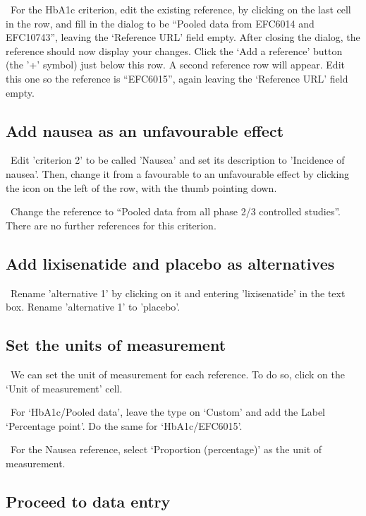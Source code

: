 \documentclass[00_mcda_tutorial.tex]{subfiles}
\begin{document}
\noindent \leftpointright \, For the HbA1c criterion, edit the existing reference, by clicking on the last cell in the row, and fill in the dialog to be  “Pooled data from EFC6014 and EFC10743”, leaving the ‘Reference URL’ field empty. After closing the dialog, the reference should now display your changes. Click  the ‘Add a reference’ button (the '+' symbol) just below this row. A second reference row will appear. Edit this one so the reference is “EFC6015”, again leaving the ‘Reference URL’ field empty.

\subsection*{Add nausea as an unfavourable effect}
\noindent \leftpointright \, Edit 'criterion 2' to be called 'Nausea' and set its description to 'Incidence of nausea'. Then, change it from a favourable to an unfavourable effect by clicking the icon on the left of the row, with the thumb pointing down.
\newline

\noindent \leftpointright \, Change the reference to “Pooled data from all phase 2/3 controlled studies”.  There are no further references for this criterion.

\subsection*{Add lixisenatide and placebo as alternatives}
\noindent \leftpointright \, Rename 'alternative 1' by clicking on it and entering 'lixisenatide' in the text box. Rename 'alternative 1' to 'placebo'.

\subsection*{Set the units of measurement}
\noindent \leftpointright \, We can set the unit of measurement for each reference. To do so, click on the ‘Unit of measurement’ cell.
\newline

\noindent \leftpointright \, For ‘HbA1c/Pooled data’, leave the type on ‘Custom’ and add the Label ‘Percentage point’. Do the same for ‘HbA1c/EFC6015’.
\newline

\noindent \leftpointright \, For the Nausea reference, select ‘Proportion (percentage)’ as the unit of measurement.
\newline

\subsection*{Proceed to data entry}
\end{document}
